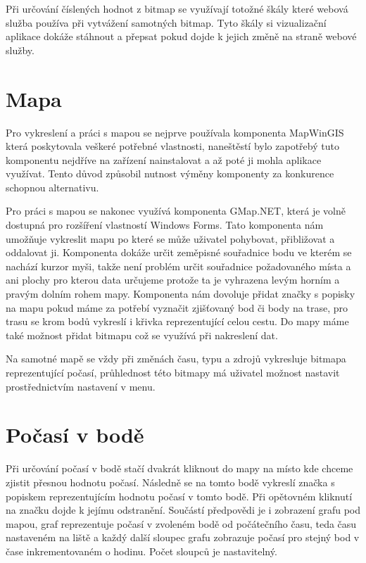 \documentclass[czech,bachelor,dept460,male,csharp,cpdeclaration]{diploma}
\begin{document}
	Při určování číslených hodnot z bitmap se využívají totožné škály které webová služba používa při vytvážení samotných bitmap. Tyto škály si vizualizační aplikace dokáže stáhnout a přepsat pokud dojde k jejich změně na straně webové služby.
	
	\section{Mapa}
	
	Pro vykreslení a práci s mapou se nejprve používala komponenta MapWinGIS která poskytovala veškeré potřebné vlastnosti, naneštěstí bylo zapotřebý tuto komponentu nejdříve na zařízení nainstalovat a až poté ji mohla aplikace využívat. Tento důvod způsobil nutnost výměny komponenty za konkurence schopnou alternativu.
	
	Pro práci s mapou se nakonec využívá komponenta GMap.NET, která je volně dostupná pro rozšíření vlastností Windows Forms. Tato komponenta nám umožňuje vykreslit mapu po které se může uživatel pohybovat, přibližovat a oddalovat ji. Komponenta dokáže určit zeměpisné souřadnice bodu ve kterém se nachází kurzor myši, takže není problém určit souřadnice požadovaného místa a ani plochy pro kterou data určujeme protože ta je vyhrazena levým horním a pravým dolním rohem mapy. Komponenta nám dovoluje přidat značky s popisky na mapu pokud máme za potřebí vyznačit zjišťovaný bod či body na trase, pro trasu se krom bodů vykreslí i křivka reprezentující celou cestu. Do mapy máme také možnost přidat bitmapu což se využívá při nakreslení dat.
	
	Na samotné mapě se vždy při změnách času, typu a zdrojů vykresluje bitmapa reprezentující počasí, průhlednost této bitmapy má uživatel možnost nastavit prostřednictvím nastavení v menu.
	
	\section{Počasí v bodě}
	
	Při určování počasí v bodě stačí dvakrát kliknout do mapy na místo kde chceme zjistit přesnou hodnotu počasí. Následně se na tomto bodě vykreslí značka s popiskem reprezentujícím hodnotu počasí v tomto bodě. Při opětovném kliknutí na značku dojde k jejímu odstranění. Součástí předpovědi je i zobrazení grafu pod mapou, graf reprezentuje počasí v zvoleném bodě od počátečního času, teda času nastaveném na liště a každý další sloupec grafu zobrazuje počasí pro stejný bod v čase inkrementovaném o hodinu. Počet sloupců je nastavitelný.
	
\end{document}
